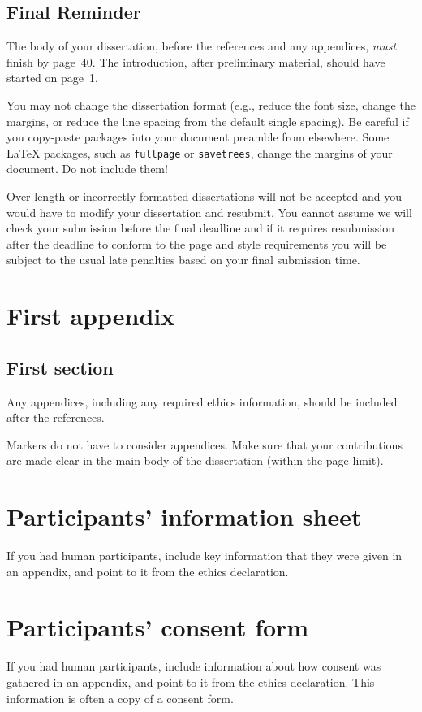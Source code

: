 \documentclass[logo,bsc,singlespacing,parskip]{infthesis}
\theoremstyle{definition}
\begin{document}
\section{Final Reminder}

The body of your dissertation, before the references and any appendices,
\emph{must} finish by page~40. The introduction, after preliminary material,
should have started on page~1.

You may not change the dissertation format (e.g., reduce the font size, change
the margins, or reduce the line spacing from the default single spacing). Be
careful if you copy-paste packages into your document preamble from elsewhere.
Some \LaTeX{} packages, such as \texttt{fullpage} or \texttt{savetrees}, change
the margins of your document. Do not include them!

Over-length or incorrectly-formatted dissertations will not be accepted and you
would have to modify your dissertation and resubmit. You cannot assume we will
check your submission before the final deadline and if it requires resubmission
after the deadline to conform to the page and style requirements you will be
subject to the usual late penalties based on your final submission time.

% 
%
%
\printbibliography


\appendix

\chapter{First appendix}

\section{First section}

Any appendices, including any required ethics information, should be included
after the references.

Markers do not have to consider appendices. Make sure that your contributions
are made clear in the main body of the dissertation (within the page limit).

\chapter{Participants' information sheet}

If you had human participants, include key information that they were given in
an appendix, and point to it from the ethics declaration.

\chapter{Participants' consent form}

If you had human participants, include information about how consent was
gathered in an appendix, and point to it from the ethics declaration.
This information is often a copy of a consent form.
\end{document}
